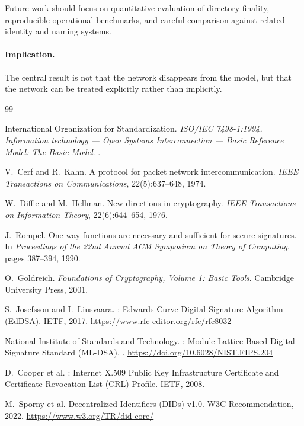 \documentclass[11pt,a4paper]{article}
\begin{document}
Future work should focus on quantitative evaluation of directory finality, reproducible operational benchmarks, and careful comparison against related identity and naming systems.

\paragraph{Implication.} The central result is not that the network disappears from the model, but that the network can be treated explicitly rather than implicitly.

\begin{thebibliography}{99}

International Organization for Standardization.
\newblock \textit{ISO/IEC 7498-1:1994, Information technology --- Open Systems Interconnection --- Basic Reference Model: The Basic Model}.
.

V.~Cerf and R.~Kahn.
\newblock A protocol for packet network intercommunication.
\newblock \textit{IEEE Transactions on Communications}, 22(5):637--648, 1974.

W.~Diffie and M.~Hellman.
\newblock New directions in cryptography.
\newblock \textit{IEEE Transactions on Information Theory}, 22(6):644--654, 1976.

J.~Rompel.
\newblock One-way functions are necessary and sufficient for secure signatures.
\newblock In \textit{Proceedings of the 22nd Annual ACM Symposium on Theory of Computing}, pages 387--394, 1990.

O.~Goldreich.
\newblock \textit{Foundations of Cryptography, Volume 1: Basic Tools}.
\newblock Cambridge University Press, 2001.

S.~Josefsson and I.~Liusvaara.
: Edwards-Curve Digital Signature Algorithm ({EdDSA}).
\newblock IETF, 2017. \url{https://www.rfc-editor.org/rfc/rfc8032}

National Institute of Standards and Technology.
: Module-Lattice-Based Digital Signature Standard ({ML-DSA}).
. \url{https://doi.org/10.6028/NIST.FIPS.204}

D.~Cooper et al.
: Internet X.509 Public Key Infrastructure Certificate and Certificate Revocation List (CRL) Profile.
\newblock IETF, 2008.

M.~Sporny et al.
\newblock Decentralized Identifiers (DIDs) v1.0.
\newblock W3C Recommendation, 2022. \url{https://www.w3.org/TR/did-core/}


\end{thebibliography}
\end{document}
